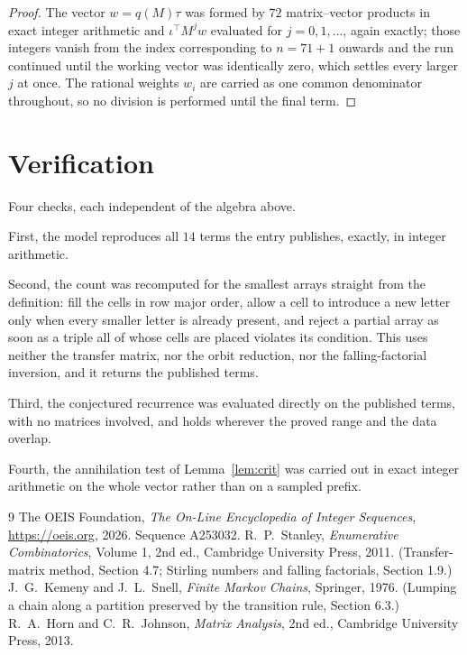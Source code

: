 \documentclass[11pt,a4paper]{article}
\theoremstyle{plain}
\theoremstyle{definition}
\begin{document}
\begin{proof}
The vector $w=q(M)\tau$ was formed by $72$ matrix--vector products in exact integer
arithmetic and $\iota^{\!\top}M^{j}w$ evaluated for $j=0,1,\dots$, again exactly; those
integers vanish from the index corresponding to $n=71+1$ onwards and the run continued
until the working vector was identically zero, which settles every larger $j$ at once. The
rational weights $w_i$ are carried as one common denominator throughout, so no division is
performed until the final term.
\end{proof}

\section{Verification}

Four checks, each independent of the algebra above.

First, the model reproduces all $14$ terms the entry publishes, exactly, in integer
arithmetic.

Second, the count was recomputed for the smallest arrays straight from the definition: fill the
cells in row major order, allow a cell to introduce a new letter only when every smaller letter
is already present, and reject a partial array as soon as a triple all of whose cells are
placed violates its condition. This uses neither the transfer matrix, nor the orbit reduction,
nor the falling-factorial inversion, and it returns the published terms.

Third, the conjectured recurrence was evaluated directly on the published terms, with no
matrices involved, and holds wherever the proved range and the data overlap.

Fourth, the annihilation test of Lemma~\ref{lem:crit} was carried out in exact integer
arithmetic on the whole vector rather than on a sampled prefix.

\begin{thebibliography}{9}
 The OEIS Foundation, \emph{The On-Line Encyclopedia of Integer
Sequences}, \url{https://oeis.org}, 2026. Sequence A253032.
 R.~P.~Stanley, \emph{Enumerative Combinatorics}, Volume 1, 2nd ed.,
Cambridge University Press, 2011. (Transfer-matrix method, Section 4.7; Stirling numbers and
falling factorials, Section 1.9.)
 J.~G.~Kemeny and J.~L.~Snell, \emph{Finite Markov Chains}, Springer,
1976. (Lumping a chain along a partition preserved by the transition rule, Section 6.3.)
 R.~A.~Horn and C.~R.~Johnson, \emph{Matrix Analysis}, 2nd ed., Cambridge
University Press, 2013.
\end{thebibliography}
\end{document}
